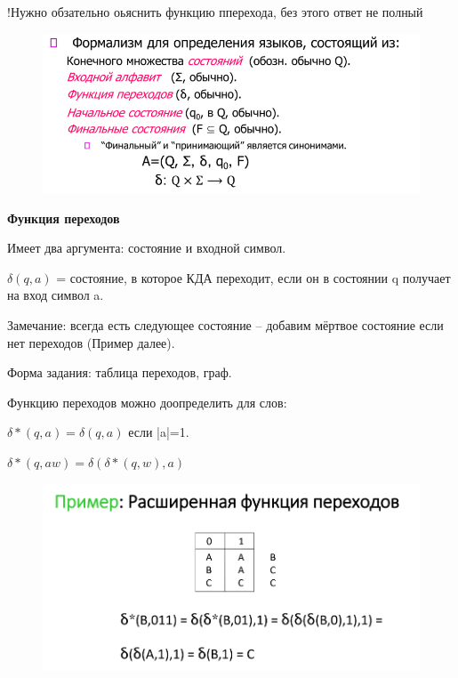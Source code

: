 \documentclass{article}
\begin{document}
!Нужно обзательно оьяснить функцию пперехода, без этого ответ не полный

\begin{figure}[H]
    \centering
    \includegraphics[width=1\linewidth]{Снимок экрана 2025-03-06 091303.png}
\end{figure}


\textbf{Функция переходов}



Имеет два аргумента: состояние и входной символ.

$\delta(q,a)$ = состояние, в которое КДА переходит, если он в
состоянии q получает на вход символ a.

Замечание: всегда есть следующее состояние – добавим
мёртвое состояние если нет переходов (Пример далее).

Форма задания: таблица переходов, граф.

Функцию переходов можно доопределить для слов:

$\delta*(q, a) = \delta(q,a)$  если |a|=1.

$\delta*(q, aw) = \delta(\delta*(q, w) , a)$

\begin{figure}[H]
    \centering
    \includegraphics[width=1\linewidth]{Снимок экрана 2025-03-06 092352.png}
\end{figure}
\end{document}

